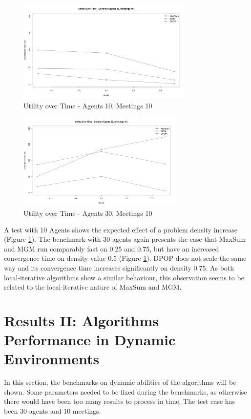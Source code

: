 \begin{figure}[H]
\centering
\includegraphics[width=330px]{graphics/experiments/static/st_17}
\caption{Utility over Time - Agents 10, Meetings 10}
\label{fig:st_17}
\end{figure}
\begin{figure}[H]
\centering
\includegraphics[width=310px]{graphics/experiments/static/st_18}
\caption{Utility over Time - Agents 30, Meetings 10}
\label{fig:st_18}
\end{figure}
A test with 10 Agents shows the expected effect of a problem density increase (Figure \ref{fig:st_17}). The benchmark with 30 agents again presents the case that MaxSum and MGM run comparably fast on 0.25 and 0.75, but have an increased convergence time on density value 0.5 (Figure \ref{fig:st_17}). DPOP does not scale the same way and its convergence time increases significantly on density 0.75. As both local-iterative algorithms show a similar behaviour, this observation seems to be related to the local-iterative nature of MaxSum and MGM.

\section{Results II: Algorithms Performance in Dynamic Environments}

In this section, the benchmarks on dynamic abilities of the algorithms will be shown. Some parameters needed to be fixed during the benchmarks, as otherwise there would have been too many results to process in time. The test case has been 30 agents and 10 meetings.

